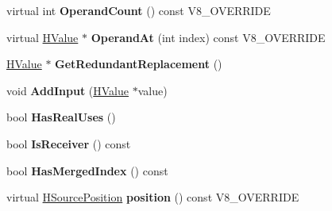 \begin{DoxyCompactItemize}
\item 
\hypertarget{classv8_1_1internal_1_1_v8___f_i_n_a_l_a74577ee66b859bf4d6d38144bd3b3d4c}{}virtual int {\bfseries Operand\+Count} () const V8\+\_\+\+O\+V\+E\+R\+R\+I\+D\+E\label{classv8_1_1internal_1_1_v8___f_i_n_a_l_a74577ee66b859bf4d6d38144bd3b3d4c}

\item 
\hypertarget{classv8_1_1internal_1_1_v8___f_i_n_a_l_a82dac9e772c6aaf9b66c35530d0151a3}{}virtual \hyperlink{classv8_1_1internal_1_1_h_value}{H\+Value} $\ast$ {\bfseries Operand\+At} (int index) const V8\+\_\+\+O\+V\+E\+R\+R\+I\+D\+E\label{classv8_1_1internal_1_1_v8___f_i_n_a_l_a82dac9e772c6aaf9b66c35530d0151a3}

\item 
\hypertarget{classv8_1_1internal_1_1_v8___f_i_n_a_l_afc809923f9acd44b1ebb510f3addbda0}{}\hyperlink{classv8_1_1internal_1_1_h_value}{H\+Value} $\ast$ {\bfseries Get\+Redundant\+Replacement} ()\label{classv8_1_1internal_1_1_v8___f_i_n_a_l_afc809923f9acd44b1ebb510f3addbda0}

\item 
\hypertarget{classv8_1_1internal_1_1_v8___f_i_n_a_l_a527558444a4d1654479011c6a8f1913a}{}void {\bfseries Add\+Input} (\hyperlink{classv8_1_1internal_1_1_h_value}{H\+Value} $\ast$value)\label{classv8_1_1internal_1_1_v8___f_i_n_a_l_a527558444a4d1654479011c6a8f1913a}

\item 
\hypertarget{classv8_1_1internal_1_1_v8___f_i_n_a_l_a4aafe2e1d21b3cd6bc9f0f2ce9aae264}{}bool {\bfseries Has\+Real\+Uses} ()\label{classv8_1_1internal_1_1_v8___f_i_n_a_l_a4aafe2e1d21b3cd6bc9f0f2ce9aae264}

\item 
\hypertarget{classv8_1_1internal_1_1_v8___f_i_n_a_l_a50cbc6037cfbea5f6a20195e3b5da90a}{}bool {\bfseries Is\+Receiver} () const \label{classv8_1_1internal_1_1_v8___f_i_n_a_l_a50cbc6037cfbea5f6a20195e3b5da90a}

\item 
\hypertarget{classv8_1_1internal_1_1_v8___f_i_n_a_l_a12237ce1a615d8baeb4f853d646bfc99}{}bool {\bfseries Has\+Merged\+Index} () const \label{classv8_1_1internal_1_1_v8___f_i_n_a_l_a12237ce1a615d8baeb4f853d646bfc99}

\item 
\hypertarget{classv8_1_1internal_1_1_v8___f_i_n_a_l_a23ee59f81a2063952cc676f1fcf4e833}{}virtual \hyperlink{classv8_1_1internal_1_1_h_source_position}{H\+Source\+Position} {\bfseries position} () const V8\+\_\+\+O\+V\+E\+R\+R\+I\+D\+E\label{classv8_1_1internal_1_1_v8___f_i_n_a_l_a23ee59f81a2063952cc676f1fcf4e833}


\end{DoxyCompactItemize}
